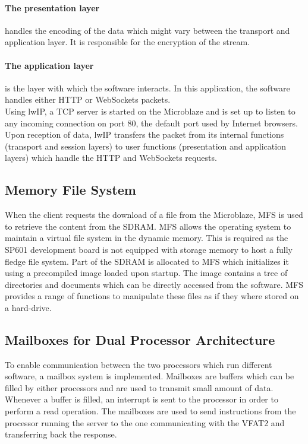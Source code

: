       \paragraph{The presentation layer} handles the encoding of the data which might vary between the transport and application layer. It is responsible for the encryption of the stream.

      \paragraph{The application layer} is the layer with which the software interacts. In this application, the software handles either HTTP or WebSockets packets. \\

      Using lwIP, a TCP server is started on the Microblaze and is set up to listen to any incoming connection on port 80, the default port used by Internet browsers. Upon reception of data, lwIP transfers the packet from its internal functions (transport and session layers) to user functions (presentation and application layers) which handle the HTTP and WebSockets requests.

    \subsection{Memory File System}

      When the client requests the download of a file from the Microblaze, MFS is used to retrieve the content from the SDRAM. MFS allows the operating system to maintain a virtual file system in the dynamic memory. This is required as the SP601 development board is not equipped with storage memory to host a fully fledge file system. Part of the SDRAM is allocated to MFS which initializes it using a precompiled image loaded upon startup. The image contains a tree of directories and documents which can be directly accessed from the software. MFS provides a range of functions to manipulate these files as if they where stored on a hard-drive.

    \subsection{Mailboxes for Dual Processor Architecture}

      To enable communication between the two processors which run different software, a mailbox system is implemented. Mailboxes are buffers which can be filled by either processors and are used to transmit small amount of data. Whenever a buffer is filled, an interrupt is sent to the processor in order to perform a read operation. The mailboxes are used to send instructions from the processor running the server to the one communicating with the VFAT2 and transferring back the response. \\

